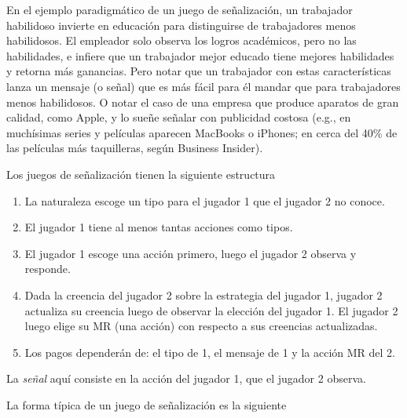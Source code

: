 \documentclass[12pt]{article}
\begin{document}
En el ejemplo paradigmático de un juego de señalización, un trabajador habilidoso invierte en educación para distinguirse de trabajadores menos habilidosos. El empleador solo observa los logros académicos, pero no las habilidades, e infiere que un trabajador mejor educado tiene mejores habilidades y retorna más ganancias. Pero notar que un trabajador con estas características lanza un mensaje (o señal) que es más fácil para él mandar que para trabajadores menos habilidosos. O notar el caso de una empresa que produce aparatos de gran calidad, como Apple, y lo sueñe señalar con publicidad costosa (e.g., en muchísimas series y películas aparecen MacBooks o iPhones; en cerca del 40\% de las películas más taquilleras, según Business Insider).

Los juegos de señalización tienen la siguiente estructura

\begin{enumerate}
	\setlength{\itemsep}{0pt}
	\setlength{\parskip}{0pt}
	\setlength{\parsep}{0pt}
	\item La naturaleza escoge un tipo para el jugador 1 que el jugador 2 no conoce.
	\item El jugador 1 tiene al menos tantas acciones como tipos.
	\item El jugador 1 escoge una acción primero, luego el jugador 2 observa y responde.
	\item Dada la creencia del jugador 2 sobre la estrategia del jugador 1, jugador 2 actualiza su creencia luego de observar la elección del jugador 1. El jugador 2 luego elige su MR (una acción) con respecto a sus creencias actualizadas.
	\item Los pagos dependerán de: el tipo de 1, el mensaje de 1 y la acción MR del 2.
\end{enumerate}

La \textit{señal} aquí consiste en la acción del jugador 1, que el jugador 2 observa.

La forma típica de un juego de señalización es la siguiente
\end{document}

